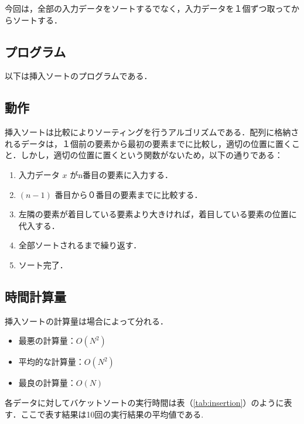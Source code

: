 \documentclass[a4j, titlepage]{jarticle}
\begin{document}
        今回は，全部の入力データをソートするでなく，入力データを１個ずつ取ってからソートする．
    
        \subsection{プログラム}
            以下は挿入ソートのプログラムである．
            

        \subsection{動作}
            挿入ソートは比較によりソーティングを行うアルゴリズムである．配列に格納されるデータは，１個前の要素から最初の要素までに比較し，適切の位置に置くこと．しかし，適切の位置に置くという関数がないため，以下の通りである：
            
            \begin{screen}
                \begin{enumerate}
                    \item 入力データ $x$ がn番目の要素に入力する．
                    \item $(n-1)$ 番目から０番目の要素までに比較する．
                    \item 左隣の要素が着目している要素より大きければ，着目している要素の位置に代入する．
                    \item 全部ソートされるまで繰り返す．
                    \item ソート完了．
                \end{enumerate}
            \end{screen}
            
        
        \subsection{時間計算量}
            挿入ソートの計算量は場合によって分れる．
            \begin{itemize}
                \item 最悪の計算量：$O(N^2)$
                \item 平均的な計算量：$O(N^2)$
                \item 最良の計算量：$O(N)$
            \end{itemize}

            各データに対してバケットソートの実行時間は表（\ref{tab:insertion}）のように表す．ここで表す結果は10回の実行結果の平均値である.
\end{document}
